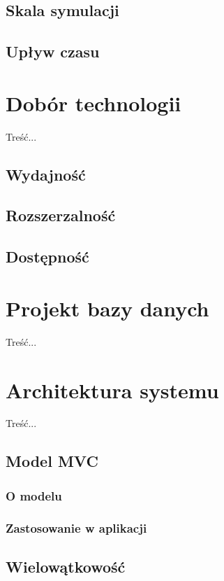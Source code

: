 \subsection{Skala symulacji}
\subsection{Upływ czasu}

\section[Dobór technologii][Dobór technologii]{Dobór technologii}
\par{ Treść... }
\subsection{Wydajność}
\subsection{Rozszerzalność}
\subsection{Dostępność}

\section[Projekt bazy danych][Projekt bazy danych]{Projekt bazy danych}
\par{ Treść... }

\section[Architektura systemu][Architektura systemu]{Architektura systemu}
\par{ Treść... }
\subsection{Model MVC}
\subsubsection{O modelu}
\subsubsection{Zastosowanie w aplikacji}
\subsection{Wielowątkowość}
